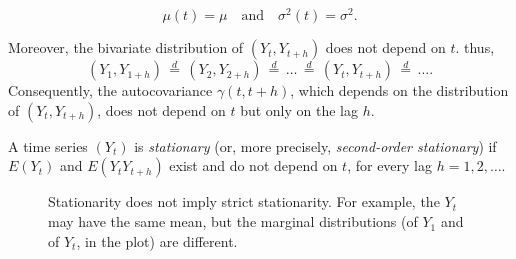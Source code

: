 \documentclass[dvipsnames,12pt]{book}
\begin{document}
            \[
            \mu(t) = \mu \quad\text{and}\quad \sigma^2(t) = \sigma^2.
            \]
            
            Moreover, the bivariate distribution of $(Y_t, Y_{t+h})$ does not depend on $t$. thus,
            \[
            (Y_1, Y_{1+h}) \,\overset{d}{=} \,(Y_2, Y_{2+h})  \,\overset{d}{=} \,\dots \,\overset{d}{=} \,(Y_t,Y_{t+h}) \,\overset{d}{=} \,\dots.
            \]
            Consequently, the autocovariance $\gamma(t,t+h)$, which depends on the distribution of $(Y_t, Y_{t+h})$, does not depend on $t$ but only on the lag $h$.
            
            \begin{definition}[Stationarity]\label{def:stationarity}
            A time series $(Y_t)$ is \emph{stationary} (or, more precisely, \emph{second-order stationary}) if $E(Y_t)$ and $E(Y_t Y_{t+h})$ exist and do not depend on $t$, for every lag $h = 1, 2, \ldots$.
            \end{definition}
    
            \begin{figure}[h]
                    \centering
                    \caption{Stationarity does not imply strict stationarity. For example, the \(Y_t\) may have the same mean, but the marginal distributions (of \(Y_1\) and of \(Y_t\), in the plot) are different.}
                    \label{fig:L3-3}
                \end{figure}
\end{document}
